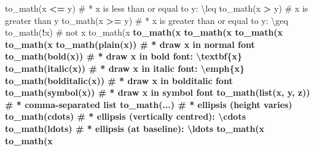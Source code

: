 \documentclass[
]{krantz}
\makeatletter
\newenvironment{Shaded}{\begin{snugshade}}{\end{snugshade}}
\newcommand{\CommentTok}[1]{\textcolor[rgb]{0.56,0.35,0.01}{\textit{#1}}}
\newcommand{\KeywordTok}[1]{\textcolor[rgb]{0.13,0.29,0.53}{\textbf{#1}}}
\newcommand{\NormalTok}[1]{#1}
\newcommand{\OperatorTok}[1]{\textcolor[rgb]{0.81,0.36,0.00}{\textbf{#1}}}
\newcommand{\StringTok}[1]{\textcolor[rgb]{0.31,0.60,0.02}{#1}}
\newenvironment{kframe}{%
\medskip{}
\setlength{\fboxsep}{.8em}
 \def\at@end@of@kframe{}%
 \ifinner\ifhmode%
  \def\at@end@of@kframe{\end{minipage}}%
  \begin{minipage}{\columnwidth}%
 \fi\fi%
 \def\FrameCommand##1{\hskip\@totalleftmargin \hskip-\fboxsep
 \colorbox{shadecolor}{##1}\hskip-\fboxsep
     \hskip-\linewidth \hskip-\@totalleftmargin \hskip\columnwidth}%
 \MakeFramed {\advance\hsize-\width
   \@totalleftmargin\z@ \linewidth\hsize
   \@setminipage}}%
 {\par\unskip\endMakeFramed%
 \at@end@of@kframe}
\renewenvironment{Shaded}{\begin{kframe}}{\end{kframe}}
\renewcommand{\KeywordTok} [1]{\textcolor[rgb]{0.00,0.44,0.13}{{#1}}}
\renewcommand{\StringTok}  [1]{\textcolor[rgb]{0.25,0.44,0.63}{{#1}}}
\renewcommand{\CommentTok} [1]{\textcolor[rgb]{0.38,0.63,0.69}{{#1}}}
\renewcommand{\NormalTok}  [1]{{#1}}
\makeatother
\begin{document}
\begin{Shaded}
\begin{Highlighting}[]
{{{{\KeywordTok{to_math}\NormalTok{(x }\OperatorTok{<=}\StringTok{ }\NormalTok{y)          }\CommentTok{# * x is less than or equal to y: \textbackslash{}leq}
\KeywordTok{to_math}\NormalTok{(x }\OperatorTok{>}\StringTok{ }\NormalTok{y)           }\CommentTok{#   x is greater than y}
\KeywordTok{to_math}\NormalTok{(x }\OperatorTok{>=}\StringTok{ }\NormalTok{y)          }\CommentTok{# * x is greater than or equal to y: \textbackslash{}geq}
\KeywordTok{to_math}\NormalTok{(}\OperatorTok{!}\NormalTok{x)              }\CommentTok{#   not x}
\KeywordTok{to_math}\NormalTok{(x }\OperatorTok{%
\KeywordTok{to_math}\NormalTok{(x }\OperatorTok{%
\KeywordTok{to_math}\NormalTok{(x }\OperatorTok{%
\KeywordTok{to_math}\NormalTok{(x }\OperatorTok{%
\KeywordTok{to_math}\NormalTok{(x }\OperatorTok{%
\KeywordTok{to_math}\NormalTok{(}\KeywordTok{plain}\NormalTok{(x))        }\CommentTok{# * draw x in normal font}
\KeywordTok{to_math}\NormalTok{(}\KeywordTok{bold}\NormalTok{(x))         }\CommentTok{# * draw x in bold font: \textbackslash{}textbf\{x\}}
\KeywordTok{to_math}\NormalTok{(}\KeywordTok{italic}\NormalTok{(x))       }\CommentTok{# * draw x in italic font: \textbackslash{}emph\{x\}}
\KeywordTok{to_math}\NormalTok{(}\KeywordTok{bolditalic}\NormalTok{(x))   }\CommentTok{# * draw x in bolditalic font}
\KeywordTok{to_math}\NormalTok{(}\KeywordTok{symbol}\NormalTok{(x))       }\CommentTok{# * draw x in symbol font}
\KeywordTok{to_math}\NormalTok{(}\KeywordTok{list}\NormalTok{(x, y, z))   }\CommentTok{# * comma-separated list}
\KeywordTok{to_math}\NormalTok{(...)             }\CommentTok{# * ellipsis (height varies)}
\KeywordTok{to_math}\NormalTok{(cdots)           }\CommentTok{# * ellipsis (vertically centred): \textbackslash{}cdots}
\KeywordTok{to_math}\NormalTok{(ldots)           }\CommentTok{# * ellipsis (at baseline): \textbackslash{}ldots}
\KeywordTok{to_math}\NormalTok{(x }\OperatorTok{%
\KeywordTok{to_math}\NormalTok{(x }\OperatorTok{%
}}}}}}}}}}}
\end{Highlighting}
\end{Shaded}
\end{document}

